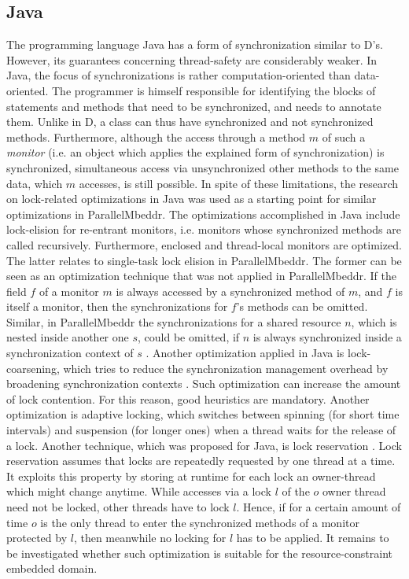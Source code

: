 \subsection{Java}
The programming language Java has a form of synchronization similar to D's. However, its guarantees concerning thread-safety are considerably weaker. In Java, the focus of synchronizations is rather computation-oriented than data-oriented. The programmer is himself responsible for identifying the blocks of statements and methods that need to be synchronized, and needs to annotate them. Unlike in D, a class can thus have synchronized and not synchronized methods. Furthermore, although the access through a method $m$ of such a \textit{monitor} (i.e. an object which applies the explained form of synchronization) is synchronized, simultaneous access via unsynchronized other methods to the same data, which $m$ accesses, is still possible. In spite of these limitations, the research on lock-related optimizations in Java was used as a starting point for similar optimizations in ParallelMbeddr. The optimizations accomplished in Java include lock-elision for re-entrant monitors, i.e. monitors whose synchronized methods are called recursively. Furthermore, enclosed and thread-local monitors are optimized. The latter relates to single-task lock elision in ParallelMbeddr. The former can be seen as an optimization technique that was not applied in ParallelMbeddr. If the field $f$ of a monitor $m$ is always accessed by a synchronized method of $m$, and $f$ is itself a monitor, then the synchronizations for $f$'s methods can be omitted. Similar, in ParallelMbeddr the synchronizations for a shared resource $n$, which is nested inside another one $s$, could be omitted, if $n$ is always synchronized inside a synchronization context of $s$ \cite{StaticAnalysesForJava}. Another optimization applied in Java is lock-coarsening, which tries to reduce the synchronization management overhead by broadening synchronization contexts \cite{JavaTheoryAndPractice}. Such optimization can increase the amount of lock contention. For this reason, good heuristics are mandatory. Another optimization is adaptive locking, which switches between spinning (for short time intervals) and suspension (for longer ones) when a thread waits for the release of a lock. Another technique, which was proposed for Java, is lock reservation \cite{LockReservation}. Lock reservation assumes that locks are repeatedly requested by one thread at a time. It exploits this property by storing at runtime for each lock an owner-thread which might change anytime. While accesses via a lock $l$ of the $o$ owner thread need not be locked, other threads have to lock $l$. Hence, if for a certain amount of time $o$ is the only thread to enter the synchronized methods of a monitor protected by $l$, then meanwhile no locking for $l$ has to be applied. It remains to be investigated whether such optimization is suitable for the resource-constraint embedded domain.

